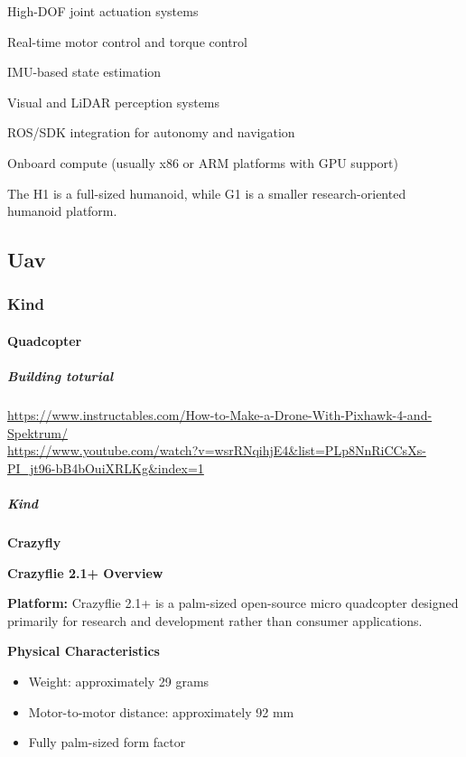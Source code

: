 \documentclass{book}
\providecommand{\ProjectDeepHeading}[2]{%
    \par\medskip\noindent\textbf{#2}\par\smallskip
}
\begin{document}
    High-DOF joint actuation systems
    
    Real-time motor control and torque control
    
    IMU-based state estimation
    
    Visual and LiDAR perception systems
    
    ROS/SDK integration for autonomy and navigation
    
    Onboard compute (usually x86 or ARM platforms with GPU support)
    
    The H1 is a full-sized humanoid, while G1 is a smaller research-oriented humanoid platform.

\subsection{Uav}

\subsubsection{Kind}

\paragraph{Quadcopter}

\subparagraph{Building toturial}


\url{https://www.instructables.com/How-to-Make-a-Drone-With-Pixhawk-4-and-Spektrum/}
    \\
    \url{https://www.youtube.com/watch?v=wsrRNqihjE4&list=PLp8NnRiCCsXs-PI_jt96-bB4bOuiXRLKg&index=1}
    

\subparagraph{Kind}

\ProjectDeepHeading{1}{Crazyfly}


\ProjectDeepHeading{4}{Crazyflie 2.1+ Overview}
        
        \textbf{Platform:} Crazyflie 2.1+ is a palm-sized open-source micro quadcopter designed primarily for research and development rather than consumer applications.
        
        \ProjectDeepHeading{5}{Physical Characteristics}
            
            \begin{itemize}
                \item Weight: approximately 29 grams
                \item Motor-to-motor distance: approximately 92 mm
                \item Fully palm-sized form factor
            \end{itemize}
        
\end{document}
